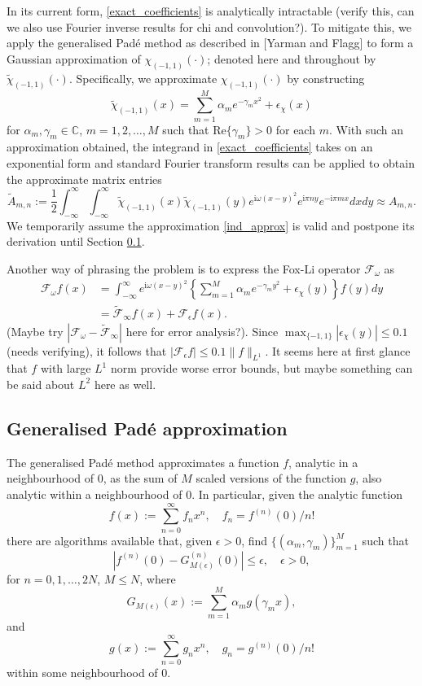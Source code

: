 \documentclass[11pt, a4paper]{article}
\newcommand{\be}{\begin{equation}}
\newcommand{\ee}{\end{equation}}
\newcommand{\im}{\text{i}}
\newcommand{\infint}{\int_{-\infty}^\infty}
\newcommand{\F}{\mathcal{F}}
\numberwithin{equation}{section}
\begin{document}
In its current form, \eqref{exact_coefficients} is analytically intractable (verify this, can we also use Fourier inverse results for chi and convolution?). To mitigate this, we apply the generalised Pad\'e method as described in [Yarman and Flagg] to form a Gaussian approximation of $\chi_{(-1, 1)}(\cdot)$; denoted here and throughout by $\tilde{\chi}_{(-1, 1)}(\cdot)$. Specifically, we approximate $\chi_{(-1, 1)}(\cdot)$ by constructing
\be\label{ind_approx}
\tilde{\chi}_{(-1, 1)}(x) = \sum_{m = 1}^M\alpha_m e^{-\gamma_m x^2} + \epsilon_\chi(x)
\ee
for $\alpha_m, \gamma_m\in\mathbb{C}$, $m = 1, 2, \dots, M$ such that Re$\{\gamma_m\} > 0$ for each $m$. With such an approximation obtained, the integrand in \eqref{exact_coefficients} takes on an exponential form and standard Fourier transform results can be applied to obtain the approximate matrix entries
\be\label{approximate_entries}
\tilde{A}_{m, n} :=  \frac{1}{2}\int_{-\infty}^\infty\int_{-\infty}^\infty \tilde{\chi}_{(-1, 1)}(x)\tilde{\chi}_{(-1, 1)}(y)e^{\im\omega(x - y)^2}e^{\im \pi n y}e^{-\im\pi m x}dxdy   \approx A_{m, n}.
\ee
We temporarily assume the approximation \eqref{ind_approx} is valid and postpone its derivation until Section \ref{Pade_approximation}.

Another way of phrasing the problem is to express the Fox-Li operator $\mathcal{F}_{\omega}$ as
\begin{align*}
\mathcal{F}_\omega f(x) &= \infint e^{\im\omega(x - y)^2}\left\{ \sum_{m = 1}^M\alpha_m e^{-\gamma_m y^2} + \epsilon_\chi(y) \right\} f(y)dy
\\
&= \tilde{\F}_\infty f(x) + \F_\epsilon f(x).
\end{align*}
(Maybe try $|\F_\omega  - \tilde{\F}_\infty|$ here for error analysis?). Since $\max_{\{-1, 1\}}|\epsilon_\chi(y)| \le 0.1$ (needs verifying), it follows that $|\F_\epsilon f| \le 0.1\|f\|_{L^1}$. It seems here at first glance that $f$ with large $L^1$ norm provide worse error bounds, but maybe something can be said about $L^2$ here as well.

\subsection{Generalised Pad\'e approximation}\label{Pade_approximation}
The generalised Pad\'e method approximates a function $f$, analytic in a neighbourhood of $0$, as the sum of $M$ scaled versions of the function $g$, also analytic within a neighbourhood of $0$. In particular, given the analytic function
\[
f(x) := \sum_{n = 0}^\infty f_nx^n, \quad f_n = f^{(n)}(0) / n!
\]
there are algorithms available that, given  $\epsilon > 0$, find $\{(\alpha_m, \gamma_m)\}_{m = 1}^M$ such that
\[
|f^{(n)}(0) - G_{M(\epsilon)}^{(n)}(0)| \le \epsilon, \quad \epsilon > 0, 
\]
for $n = 0, 1, \dots, 2N$, $M \le N$, where
\[
G_{M(\epsilon)}(x) := \sum_{m = 1}^M\alpha_mg(\gamma_m x),
\]
and
\[
g(x) := \sum_{n = 0}^\infty g_nx^n, \quad g_n = g^{(n)}(0) / n!
\]
within some neighbourhood of $0$.
\end{document}
